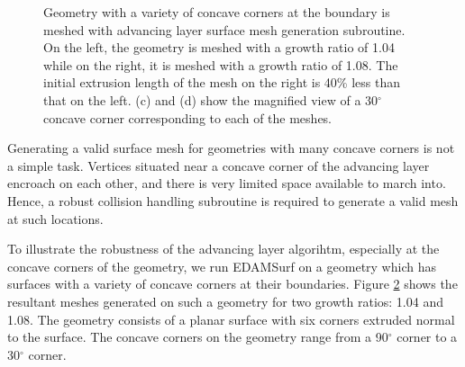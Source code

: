 \begin{figure}
\begin{subfigure}{0.5\textwidth}
		\caption{}
		\label{fig-variousAngle-corner-high}
	\end{subfigure}
	\caption[EdamSurf mesh of a geometry with plenty of concave corners (robustness test case 1).]{Geometry with a variety of concave corners at the boundary is meshed with advancing layer surface mesh generation subroutine. On the left, the geometry is meshed with a growth ratio of 1.04 while on the right, it is meshed with a growth ratio of 1.08. The initial extrusion length of the mesh on the right is 40\% less than that on the left. (c) and (d) show the magnified view of a 30$^\circ$ concave corner corresponding to each of the meshes.}
	\label{fig-variousAngle}
\end{figure}

Generating a valid surface mesh for geometries with many concave corners is not a simple task. Vertices situated near a concave corner of the advancing layer encroach on each other, and there is very limited space available to march into. Hence, a robust collision handling subroutine is required to generate a valid mesh at such locations.

To illustrate the robustness of the advancing layer algorihtm, especially at the concave corners of the geometry, we run EDAMSurf on a geometry which has surfaces with a variety of concave corners at their boundaries. Figure \ref{fig-variousAngle} shows the resultant meshes generated on such a geometry for two growth ratios: 1.04 and 1.08. The geometry consists of a planar surface with six corners extruded normal to the surface. The concave corners on the geometry range from a 90$^\circ$ corner to a 30$^\circ$ corner.

